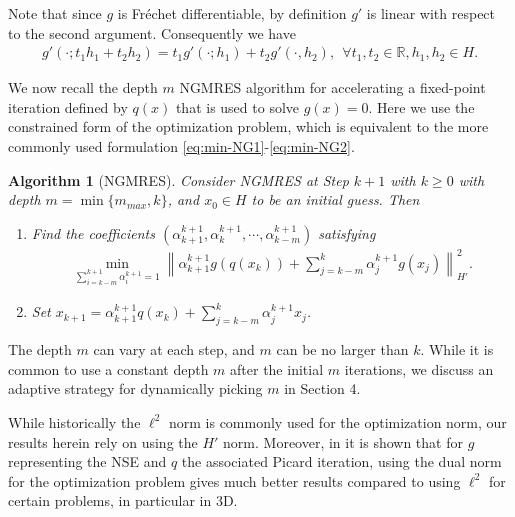 \documentclass{article}
\numberwithin{equation}{section}
\newtheorem{alg}[thm]{Algorithm}
\begin{document}
Note that since $g$ is Fr\'echet differentiable, by definition $g'$ is linear with respect to the second argument.
Consequently we have
   \begin{align}
   \label{dglinear}
       g'(\cdot; t_1h_1+ t_2h_2) = t_1g'(\cdot ; h_1) + t_2 g'(\cdot, h_2),\ \  \forall t_1,t_2\in \mathbb{R}, h_1,h_2\in H.
   \end{align} 
 
We now recall the depth $m$ NGMRES algorithm
for accelerating a fixed-point iteration defined by $q(x)$ that is  used to solve $g(x)=0$.  Here we use the constrained form of the optimization problem, which is equivalent to the more commonly used formulation \eqref{eq:min-NG1}-\eqref{eq:min-NG2}.  
 
\begin{alg}[NGMRES]
\label{alg:ngmres}
Consider NGMRES at Step $k+1$ with $k\geq 0$ with depth $m=\min \{ m_{max},k \}$, and $x_0\in H$ to be an initial guess. Then
\begin{enumerate}
    \item [1.] Find the coefficients $(\alpha^{k+1}_{k+1}, \alpha^{k+1}_{k}, \cdots, \alpha^{k+1}_{k-m})$ satisfying 
    \begin{align}
       \min\limits_{\sum\limits_{i=k-m}^{k+1} \alpha_i^{k+1} =1} \left\| \alpha_{k+1}^{k+1} g(q(x_k)) + \sum\limits_{j=k-m}^k \alpha^{k+1}_j g(x_j) \right\|^2_{H'}.
       \label{minstep}
    \end{align}
    \item [2.] Set $x_{k+1} =\alpha_{k+1}^{k+1} q(x_k) + \sum\limits_{j=k-m}^k \alpha^{k+1}_j x_j $.
\end{enumerate}
\end{alg}
The depth $m$ can vary at each step, and $m$ can be no larger than $k$.  While it is common to use a constant depth $m$ after the initial $m$ iterations, we discuss an adaptive strategy for dynamically picking $m$ in Section 4.

While historically the $\ell^2$ norm is commonly used for the optimization norm, our results herein rely on using the $H'$ norm.  Moreover, in \cite{HR26} it is shown that for $g$ representing the NSE and $q$ the associated Picard iteration, using the dual norm for the optimization problem gives much better results compared to using $\ell^2$ for certain problems, in particular in 3D.
\end{document}
